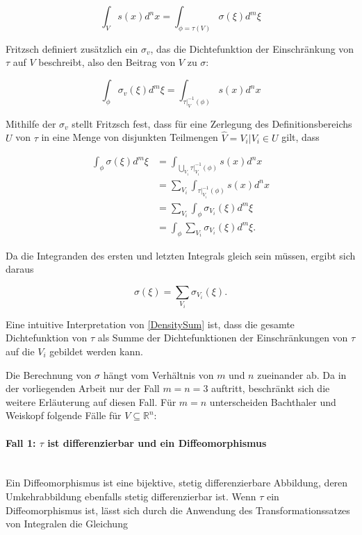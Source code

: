 \documentclass[a4paper,fontsize=12pt,toc=bib,parskip=half,ngerman]{scrartcl}
\begin{document}
\begin{equation}
\int_{V}s(x)d^nx = \int_{\phi = \tau(V)}\sigma(\xi)d^m\xi
\end{equation}

Fritzsch \cite[S.~20~f.]{fritzsch2016continuousScatterplot} definiert zus\"atzlich ein $\sigma_v$, das die Dichtefunktion der Einschr\"ankung von $\tau$ auf $V$ beschreibt, also den \glq Beitrag\grq{} von $V$ zu $\sigma$:

\begin{equation}
\int_{\phi} \sigma_v(\xi)d^m\xi = \int_{\tau|_V^{-1}(\phi)}s(x)d^nx
\end{equation}

Mithilfe der $\sigma_v$ stellt Fritzsch fest, dass f\"ur eine Zerlegung des Definitionsbereichs $U$ von $\tau$ in eine Menge von disjunkten Teilmengen $\hat{V} = {V_i | V_i \in U}$ gilt, dass

\begin{equation}
\begin{split}
\int_{\phi}\sigma(\xi)d^m\xi 
&= \int_{\bigcup\limits_{V_i}\tau|_{V_i}^{-1}(\phi)} s(x)d^nx
\\
&= \sum_{V_i}\int_{\tau|_{V_i}^{-1}(\phi)} s(x)d^nx
\\
&= \sum_{V_i}\int_{\phi}\sigma_{V_i}(\xi)d^m\xi
\\
&= \int_{\phi}\sum_{V_i}\sigma_{V_i}(\xi)d^m\xi.
\end{split}
\end{equation}

Da die Integranden des ersten und letzten Integrals gleich sein m\"ussen, ergibt sich daraus

\begin{equation}
\sigma(\xi) = \sum_{V_i}\sigma_{V_i}(\xi).
\label{DensitySum}
\end{equation}

Eine intuitive Interpretation von \cref{DensitySum} ist, dass die gesamte Dichtefunktion von $\tau$ als Summe der Dichtefunktionen der Einschr\"ankungen von $\tau$ auf die $V_i$ gebildet werden kann.

Die Berechnung von $\sigma$ h\"angt vom Verh\"altnis von $m$ und $n$ zueinander ab. Da in der vorliegenden Arbeit nur der Fall $m=n=3$ auftritt, beschr\"ankt sich die weitere Erl\"auterung auf diesen Fall. F\"ur $m=n$ unterscheiden Bachthaler und Weiskopf folgende F\"alle f\"ur $V \subseteq \mathbb{R}^n$\cite[S.~1430]{bachthaler2008continuous}:

\paragraph{Fall 1: $\tau$ ist differenzierbar und ein Diffeomorphismus}\hspace{200pt}\\
Ein Diffeomorphismus ist eine bijektive, stetig differenzierbare Abbildung, deren Umkehrabbildung ebenfalls stetig differenzierbar ist. 
Wenn $\tau$ ein Diffeomorphismus ist, l\"asst sich durch die Anwendung des Transformationssatzes von Integralen die Gleichung 
\end{document}
